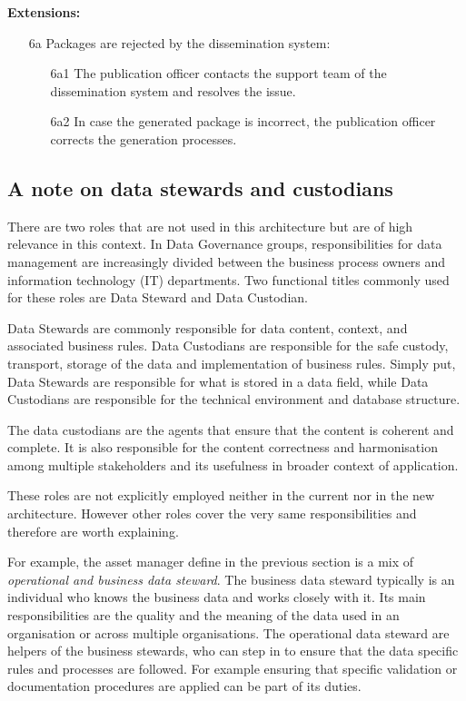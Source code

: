 	\textbf{Extensions:}
	\enlargethispage{5\baselineskip}
	\begin{enumerate}
		\item [6a] Packages are rejected by the dissemination system:
		\begin{enumerate}
			\item [6a1] The publication officer contacts the support team of the dissemination system and resolves the issue. 
			\item [6a2] In case the generated package is incorrect, the publication officer corrects the generation processes.
		\end{enumerate}
	\end{enumerate}
    
    \vspace{2em}
    
    \subsection{A note on data stewards and custodians}
    \label{sec:data-stewards}
    
    There are two roles that are not used in this architecture but are of high relevance in this context. In Data Governance groups, responsibilities for data management are increasingly divided between the business process owners and information technology (IT) departments. Two functional titles commonly used for these roles are Data Steward and Data Custodian.
     
     Data Stewards are commonly responsible for data content, context, and associated business rules. Data Custodians are responsible for the safe custody, transport, storage of the data and implementation of business rules. Simply put, Data Stewards are responsible for what is stored in a data field, while Data Custodians are responsible for the technical environment and database structure.
     
     The data custodians are the agents that ensure that the content is coherent and complete. It is also responsible for the content correctness and harmonisation among multiple stakeholders and its usefulness in broader context of application. 
     
     These roles are not explicitly employed neither in the current nor in the new architecture. However other roles cover the very same responsibilities and therefore are worth explaining.  
     
     For example, the asset manager define in the previous section is a mix of \textit{operational and business data steward}. The business data steward typically is an individual who knows the business data and works closely with it. Its main responsibilities are the quality and the meaning of the data used in an organisation or across multiple organisations. The operational data steward are helpers of the business stewards, who can step in to ensure that the data specific rules and processes are followed. For example ensuring that specific validation or documentation procedures are applied can be part of its duties. 
     
